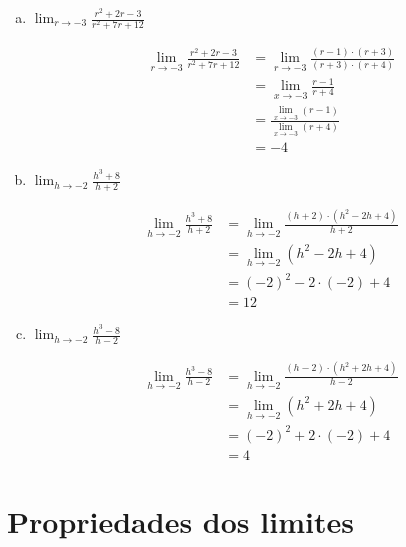 \documentclass[a4paper, 12pt]{article}
\begin{document}
\begin{enumerate}
\begin{enumerate}[(a)]
        \item $\lim_{r \to -3} \frac{r^2 + 2r - 3}{r^2 + 7r + 12}$
        
        \begin{align*}
            \lim_{r \to -3} \frac{r^2 + 2r - 3}{r^2 + 7r + 12} &= \lim_{r \to -3} \frac{(r-1) \cdot (r+3)}{(r+3) \cdot (r+4)} \\
            &= \lim_{x \to -3} \frac{r-1}{r+4} \\
            &= \frac{\lim_{x \to -3}(r-1)}{\lim_{x \to -3}(r+4)} \\
            &= -4
        \end{align*}

        \item $\lim_{h \to -2} \frac{h^3 +8}{h+2}$
        
        \begin{align*}
            \lim_{h \to -2} \frac{h^3 +8}{h+2} &= \lim_{h \to -2} \frac{(h+2) \cdot (h^2 -2h +4)}{h+2} \\
            &= \lim_{h \to -2} (h^2 -2h +4) \\
            &= (-2)^2 - 2 \cdot (-2) + 4 \\
            &= 12
        \end{align*}

        \item $\lim_{h \to -2} \frac{h^3 -8}{h-2}$
        
        \begin{align*}
            \lim_{h \to -2} \frac{h^3 -8}{h-2} &= \lim_{h \to -2} \frac{(h-2) \cdot (h^2 +2h +4)}{h-2} \\
            &= \lim_{h \to -2} (h^2 +2h +4) \\
            &= (-2)^2 + 2 \cdot (-2) + 4 \\
            &= 4
        \end{align*}
        
    \end{enumerate}
\end{enumerate}


\section{Propriedades dos limites}
\end{document}
